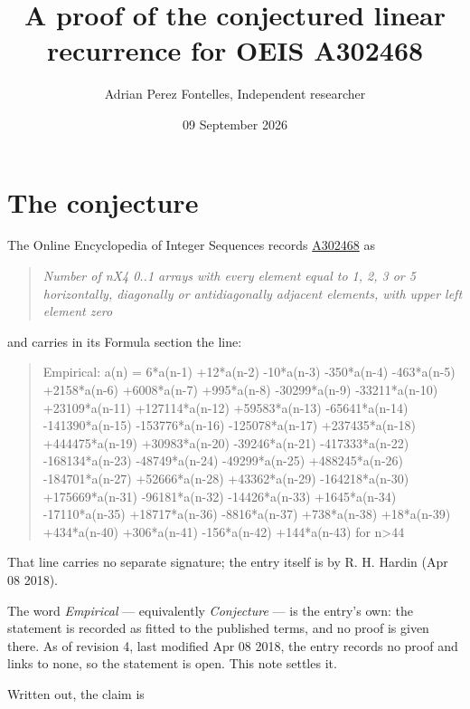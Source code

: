 \documentclass[11pt]{article}
\title{A proof of the conjectured linear recurrence for OEIS A302468}
\author{Adrian Perez Fontelles, Independent researcher}
\date{09 September 2026}
\theoremstyle{definition}
\begin{document}
\maketitle
\section{The conjecture}

The Online Encyclopedia of Integer Sequences records \href{https://oeis.org/A302468}{A302468} as

\begin{quote}\itshape Number of nX4 0..1 arrays with every element equal to 1, 2, 3 or 5 horizontally, diagonally or antidiagonally adjacent elements, with upper left element zero\end{quote}

and carries in its Formula section the line:

\begin{quote}\ttfamily Empirical: a(n) = 6*a(n-1) +12*a(n-2) -10*a(n-3) -350*a(n-4) -463*a(n-5) +2158*a(n-6) +6008*a(n-7) +995*a(n-8) -30299*a(n-9) -33211*a(n-10) +23109*a(n-11) +127114*a(n-12) +59583*a(n-13) -65641*a(n-14) -141390*a(n-15) -153776*a(n-16) -125078*a(n-17) +237435*a(n-18) +444475*a(n-19) +30983*a(n-20) -39246*a(n-21) -417333*a(n-22) -168134*a(n-23) -48749*a(n-24) -49299*a(n-25) +488245*a(n-26) -184701*a(n-27) +52666*a(n-28) +43362*a(n-29) -164218*a(n-30) +175669*a(n-31) -96181*a(n-32) -14426*a(n-33) +1645*a(n-34) -17110*a(n-35) +18717*a(n-36) -8816*a(n-37) +738*a(n-38) +18*a(n-39) +434*a(n-40) +306*a(n-41) -156*a(n-42) +144*a(n-43) for n>44\end{quote}

That line carries no separate signature; the entry itself is by R. H. Hardin (Apr 08 2018).

The word {\itshape Empirical} --- equivalently {\itshape Conjecture} --- is the entry's own: the statement is recorded as fitted to the published terms, and no proof is given there. As of revision 4, last modified Apr 08 2018, the entry records no proof and links to none, so the statement is open. This note settles it.

Written out, the claim is
\end{document}
